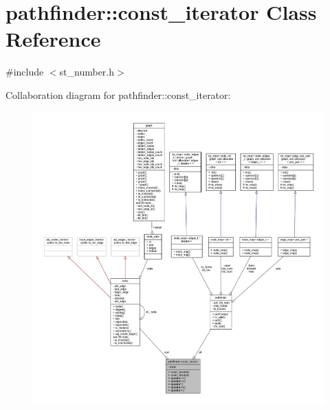 \hypertarget{classpathfinder_1_1const__iterator}{}\section{pathfinder\+:\+:const\+\_\+iterator Class Reference}
\label{classpathfinder_1_1const__iterator}


{\ttfamily \#include $<$st\+\_\+number.\+h$>$}



Collaboration diagram for pathfinder\+:\+:const\+\_\+iterator\+:\nopagebreak
\begin{figure}[H]
\begin{center}
\leavevmode
\includegraphics[width=350pt]{classpathfinder_1_1const__iterator__coll__graph}
\end{center}
\end{figure}
